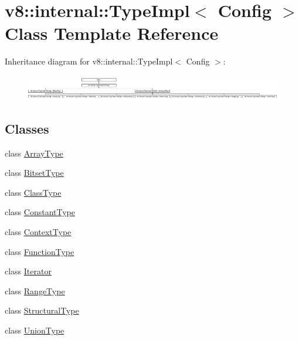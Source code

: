 \hypertarget{classv8_1_1internal_1_1_type_impl}{}\section{v8\+:\+:internal\+:\+:Type\+Impl$<$ Config $>$ Class Template Reference}
\label{classv8_1_1internal_1_1_type_impl}
Inheritance diagram for v8\+:\+:internal\+:\+:Type\+Impl$<$ Config $>$\+:\begin{figure}[H]
\begin{center}
\leavevmode
\includegraphics[height=1.111111cm]{classv8_1_1internal_1_1_type_impl}
\end{center}
\end{figure}
\subsection*{Classes}
\begin{DoxyCompactItemize}
\item 
class \hyperlink{classv8_1_1internal_1_1_type_impl_1_1_array_type}{Array\+Type}
\item 
class \hyperlink{classv8_1_1internal_1_1_type_impl_1_1_bitset_type}{Bitset\+Type}
\item 
class \hyperlink{classv8_1_1internal_1_1_type_impl_1_1_class_type}{Class\+Type}
\item 
class \hyperlink{classv8_1_1internal_1_1_type_impl_1_1_constant_type}{Constant\+Type}
\item 
class \hyperlink{classv8_1_1internal_1_1_type_impl_1_1_context_type}{Context\+Type}
\item 
class \hyperlink{classv8_1_1internal_1_1_type_impl_1_1_function_type}{Function\+Type}
\item 
class \hyperlink{classv8_1_1internal_1_1_type_impl_1_1_iterator}{Iterator}
\item 
class \hyperlink{classv8_1_1internal_1_1_type_impl_1_1_range_type}{Range\+Type}
\item 
class \hyperlink{classv8_1_1internal_1_1_type_impl_1_1_structural_type}{Structural\+Type}
\item 
class \hyperlink{classv8_1_1internal_1_1_type_impl_1_1_union_type}{Union\+Type}
\end{DoxyCompactItemize}
